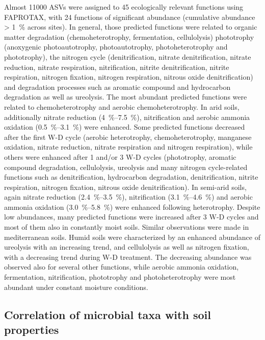 Almost \num{11000} ASVs were assigned to 45 ecologically relevant functions using FAPROTAX, with 24 functions of significant abundance (cumulative abundance \SI{> 1}{\percent} across sites). 
In general, those predicted functions were related to organic matter degradation (chemoheterotrophy, fermentation, cellulolysis) phototrophy (anoxygenic photoautotrophy, photoautotrophy, photoheterotrophy and phototrophy), the nitrogen cycle (denitrification, nitrate denitrification, nitrate reduction, nitrate respiration, nitrification, nitrite denitrification, nitrite respiration, nitrogen fixation, nitrogen respiration, nitrous oxide denitrification) and degradation processes such as aromatic compound and hydrocarbon degradation as well as ureolysis. 
The most abundant predicted functions were related to chemoheterotrophy and aerobic chemoheterotrophy. In arid soils, additionally nitrate reduction (\SIrange{4}{7.5}{\percent}), nitrification and aerobic ammonia oxidation (\SIrange{0.5}{3.1}{\percent}) were enhanced. Some predicted functions decreased after the first W-D cycle (aerobic heterotrophy, chemoheterotrophy, manganese oxidation, nitrate reduction, nitrate respiration and nitrogen respiration), while others were enhanced after 1 and/or 3 W-D cycles (phototrophy, aromatic compound degradation, cellulolysis, ureolysis and many nitrogen cycle-related functions such as denitrification, hydrocarbon degradation, denitrification, nitrite respiration, nitrogen fixation, nitrous oxide denitrification). In semi-arid soils, again nitrate reduction (\SIrange{2.4}{3.5}{\percent}), nitrification (\SIrange{3.1}{4.6}{\percent}) and aerobic ammonia oxidation (\SIrange{3.0}{5.8}{\percent}) were enhanced following heterotrophy. Despite low abundances, many predicted functions were increased after 3 W-D cycles and most of them also in constantly moist soils. Similar observations were made in mediterranean soils. Humid soils were characterized by an enhanced abundance of ureolysis with an increasing trend, and cellulolysis as well as nitrogen fixation, with a decreasing trend during W-D treatment. The decreasing abundance was observed also for several other functions, while aerobic ammonia oxidation, fermentation, nitrification, phototrophy and photoheterotrophy were most abundant under constant moisture conditions.

\subsection{Correlation of microbial taxa with soil properties}

